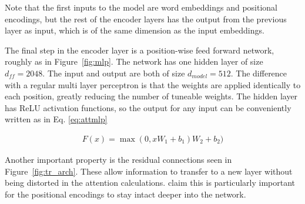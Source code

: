 Note that the first inputs to the model are word embeddings and positional encodings, but the rest of the encoder layers has the output from the previous layer as input, which is of the same dimension as the input embeddings. 

The final step in the encoder layer is a position-wise feed forward network, roughly as in Figure~\ref{fig:mlp}. The network has one hidden layer of size $d_{ff} = 2048$. The input and output are both of size $d_{model} = 512$. The difference with a regular multi layer perceptron is that the weights are applied identically to each position, greatly reducing the number of tuneable weights. The hidden layer has ReLU activation functions, so the output for any input can be conveniently written as in Eq. \ref{eq:attmlp}

\begin{align}
    F(x) = \max(0, x W_1 + b_1)W_2 + b_2)\label{eq:attmlp}
\end{align}

Another important property is the residual connections seen in Figure~\ref{fig:tr_arch}. These allow information to transfer to a new layer without being distorted in the attention calculations. \citet{NIPS2017_7181} claim this is particularly important for the positional encodings to stay intact deeper into the network. 


